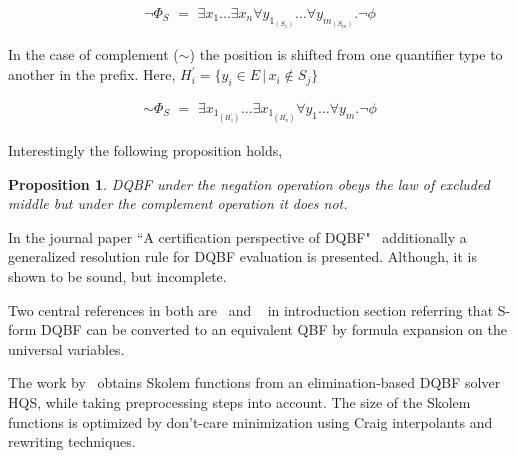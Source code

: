 \documentclass{article}
\newtheorem{prop}{Proposition}
\begin{document}
\begin{align}
\neg \Phi_{S} \,\, =   \,\, \exists x_{1}... \exists x_{n} \forall y_{1_{(S_{1})}}...\forall y_{m_{(S_{m})}} . \neg \phi \label{eq3}
\end{align}
 
In the case of complement ($\sim$) the position is shifted from one quantifier type to another in the prefix. Here, $H^{\prime}_{i} = \{ y_{i} \in E \, | \, x_{i} \notin S_{j} \}$
 
\begin{align}
 \sim \Phi_{S} \,\, =   \,\, \exists x_{1_{(H^{\prime}_1)}}... \exists x_{1_{(H^{\prime}_n)}} \forall y_{1}...\forall y_{m} . \neg \phi \label{eq4}
\end{align}
 
Interestingly the following proposition holds, 
\begin{prop}
	DQBF under the negation operation obeys the law of excluded middle but under the complement operation it does not.
\end{prop} 

In the journal paper ``A certification perspective of DQBF"~\cite{balabanov2014henkin} additionally a generalized resolution rule for DQBF evaluation is presented. Although,  it is shown to be sound, but incomplete.
	
Two central references in both are~\cite{bubeck2006dependency} and ~\cite{bubeck2010model} in introduction section referring that S-form DQBF can be converted to an equivalent QBF by formula expansion on the universal variables.
	

The work by~\cite{wimmer2016skolem} obtains Skolem functions from an elimination-based DQBF solver HQS, while taking preprocessing steps into account.
%
The size of the Skolem functions is optimized by don’t-care minimization using Craig interpolants and rewriting techniques.

%


\end{document}
